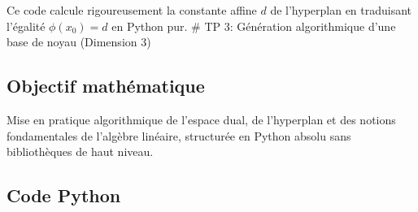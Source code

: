 Ce code calcule rigoureusement la constante affine \(d\) de l'hyperplan
en traduisant l'égalité \(\phi(x_0) = d\) en Python pur. \# TP 3:
Génération algorithmique d'une base de noyau (Dimension 3)

\hypertarget{objectif-mathuxe9matique-2}{%
\subsection{Objectif mathématique}\label{objectif-mathuxe9matique-2}}

Mise en pratique algorithmique de l'espace dual, de l'hyperplan et des
notions fondamentales de l'algèbre linéaire, structurée en Python absolu
sans bibliothèques de haut niveau.

\hypertarget{code-python-2}{%
\subsection{Code Python}\label{code-python-2}}

